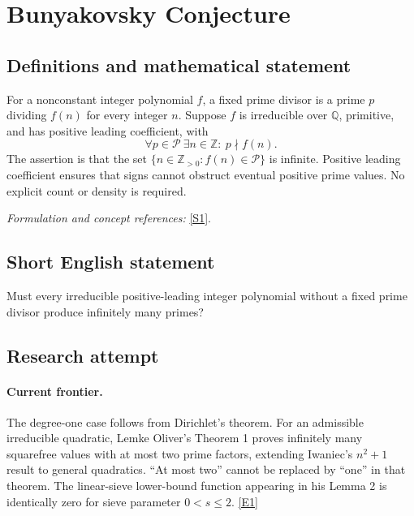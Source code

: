\documentclass[11pt]{article}
\newcommand{\Z}{\mathbb{Z}}
\newcommand{\Q}{\mathbb{Q}}
\newcommand{\sref}[2]{\hyperlink{source:#1:#2}{[S#2]}}
\newcommand{\eref}[2]{\hyperlink{extra:#1:#2}{[E#2]}}
\newif\ifshowcatalogue
\newcommand{\cataloguescope}[1]{\ifshowcatalogue
 \paragraph{Exact scope in the supplied catalogue.}
 \begin{quote}\small #1\end{quote}\fi}
\begin{document}
\setcounter{section}{0}
\clearpage
\section*{\texorpdfstring{Bunyakovsky Conjecture}{Bunyakovsky Conjecture}}\label{statement}
\subsection{Definitions and mathematical statement}
For a nonconstant integer polynomial $f$, a fixed prime divisor is a prime $p$ dividing $f(n)$ for every integer $n$. Suppose $f$ is irreducible over $\Q$, primitive, and has positive leading coefficient, with
\[
 \forall p\in\mathcal P\ \exists n\in\Z:\ p\nmid f(n).
\]
The assertion is that the set $\{n\in\Z_{>0}:f(n)\in\mathcal P\}$ is infinite. Positive leading coefficient ensures that signs cannot obstruct eventual positive prime values. No explicit count or density is required.
\par\smallskip\textit{Formulation and concept references:} \sref{statement}{1}.
\cataloguescope{Prove or disprove that every irreducible polynomial f in Z[x] with positive leading coefficient and no fixed prime divisor takes prime values for infinitely many positive integer inputs.}
\subsection{Short English statement}
Must every irreducible positive-leading integer polynomial without a fixed prime divisor produce infinitely many primes?
\subsection{Research attempt}

\paragraph{Current frontier.}
The degree-one case follows from Dirichlet's theorem. For an admissible
irreducible quadratic, Lemke Oliver's Theorem 1 proves infinitely many
squarefree values with at most two prime factors, extending Iwaniec's
$n^2+1$ result to general quadratics. ``At most two'' cannot be replaced by
``one'' in that theorem. The linear-sieve lower-bound function appearing in
his Lemma 2 is identically zero for sieve parameter $0<s\le2$.
\eref{statement}{1}
\end{document}
